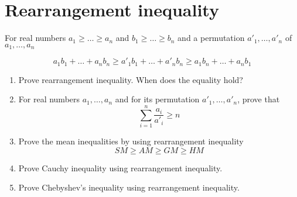 \documentclass{article}
\begin{document}
\newpage
\section{Rearrangement inequality}

For real numbers $a_1 \geq \dots \geq a_n$ and $b_1 \geq \dots \geq b_n$ and a permutation $a'_1,\dots,a'_n$ of $a_1,\dots,a_n$

$$a_1b_1+\dots+a_nb_n \geq a'_1b_1 + \dots + a'_nb_n \geq a_1b_n+ \dots+ a_nb_1 $$

\begin{enumerate}[resume]
	\item
	Prove rearrangement inequality. When does the equality hold?

	\item
	For real numbers $a_1,\dots,a_n$ and for its permutation $a'_1,\dots,a'_n$, prove that
	$$\sum_{i=1}^{n} \frac{a_i}{a'_i} \geq n $$
		
	\item
	Prove the mean inequalities by using rearrangement inequality
	$$	SM \geq AM \geq GM \geq HM$$

	\item
	Prove Cauchy inequality using rearrangement inequality.

	\item
	Prove Chebyshev's inequality using rearrangement inequality.

\end{enumerate}
\end{document}
